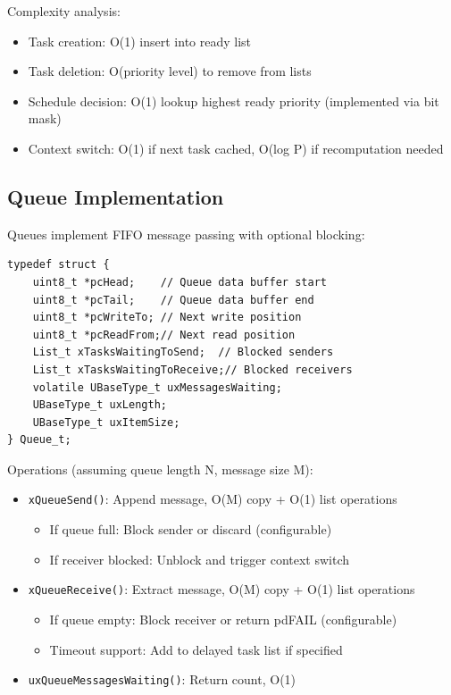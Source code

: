 \documentclass[conference]{IEEEtran}
\begin{document}
Complexity analysis:
\begin{itemize}
    \item Task creation: O(1) insert into ready list
    \item Task deletion: O(priority level) to remove from lists
    \item Schedule decision: O(1) lookup highest ready priority (implemented via bit mask)
    \item Context switch: O(1) if next task cached, O(log P) if recomputation needed
\end{itemize}

\subsection{Queue Implementation}
Queues implement FIFO message passing with optional blocking:

\begin{lstlisting}
typedef struct {
    uint8_t *pcHead;    // Queue data buffer start
    uint8_t *pcTail;    // Queue data buffer end
    uint8_t *pcWriteTo; // Next write position
    uint8_t *pcReadFrom;// Next read position
    List_t xTasksWaitingToSend;  // Blocked senders
    List_t xTasksWaitingToReceive;// Blocked receivers
    volatile UBaseType_t uxMessagesWaiting;
    UBaseType_t uxLength;
    UBaseType_t uxItemSize;
} Queue_t;
\end{lstlisting}

Operations (assuming queue length N, message size M):
\begin{itemize}
    \item \texttt{xQueueSend()}: Append message, O(M) copy + O(1) list operations
    \begin{itemize}
        \item If queue full: Block sender or discard (configurable)
        \item If receiver blocked: Unblock and trigger context switch
    \end{itemize}
    
    \item \texttt{xQueueReceive()}: Extract message, O(M) copy + O(1) list operations
    \begin{itemize}
        \item If queue empty: Block receiver or return pdFAIL (configurable)
        \item Timeout support: Add to delayed task list if specified
    \end{itemize}
    
    \item \texttt{uxQueueMessagesWaiting()}: Return count, O(1)
\end{itemize}
\end{document}
